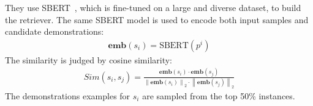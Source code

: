 They use SBERT~\citep{reimers-2019-sentence-bert}, which is fine-tuned on a large and diverse dataset, to build the retriever. The same SBERT model is used to encode both input samples and candidate demonstrations:
\begin{align}
	\textbf{emb}(s_i) = \mbox{SBERT}(p^i)
	\label{eq:emb}
\end{align}
The similarity is judged by cosine similarity:
\begin{align}
	Sim(s_i, s_j) = \frac{\textbf{emb}(s_i)\cdot \textbf{emb}(s_j)}{\left \| \textbf{emb}(s_i)\right \|_2\cdot \left \| \textbf{emb}(s_j)\right \|_2}
	\label{eq:sim}
\end{align}
The demonstrations examples for $s_i$ are sampled from the top 50\% instances.
